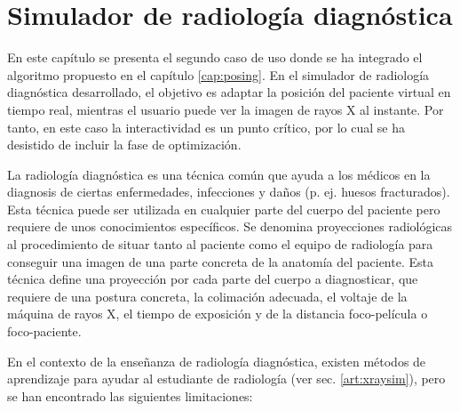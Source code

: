 \chapter{Simulador de radiología diagnóstica} 
\label{cap:xray}

En este capítulo se presenta el segundo caso de uso donde se ha integrado el algoritmo propuesto en el capítulo \ref{cap:posing}. En el simulador de radiología diagnóstica desarrollado, el objetivo es adaptar la posición del paciente virtual en tiempo real, mientras el usuario puede ver la imagen de rayos X al instante. Por tanto, en este caso la interactividad es un punto crítico, por lo cual se ha desistido de incluir la fase de optimización.


La radiología diagnóstica es una técnica común que ayuda a los médicos en la diagnosis de ciertas enfermedades, infecciones y daños (p. ej. huesos fracturados). Esta técnica puede ser utilizada en cualquier parte del cuerpo del paciente pero requiere de unos conocimientos específicos. Se denomina proyecciones radiológicas al procedimiento de situar tanto al paciente como el equipo de radiología para conseguir una imagen de una parte concreta de la anatomía del paciente. Esta técnica define una proyección por cada parte del cuerpo a diagnosticar, que requiere de una postura concreta, la colimación adecuada, el voltaje de la máquina de rayos X, el tiempo de exposición y de la distancia foco-película o foco-paciente. 


En el contexto de la enseñanza de radiología diagnóstica, existen métodos de aprendizaje para ayudar al estudiante de radiología (ver sec. \ref{art:xraysim}), pero se han encontrado las siguientes limitaciones:

